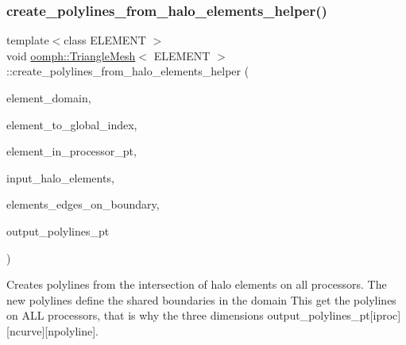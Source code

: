 \subsubsection{\texorpdfstring{create\+\_\+polylines\+\_\+from\+\_\+halo\+\_\+elements\+\_\+helper()}{create\_polylines\_from\_halo\_elements\_helper()}}
{\footnotesize\ttfamily template$<$class E\+L\+E\+M\+E\+NT $>$ \\
void \hyperlink{classoomph_1_1TriangleMesh}{oomph\+::\+Triangle\+Mesh}$<$ E\+L\+E\+M\+E\+NT $>$\+::create\+\_\+polylines\+\_\+from\+\_\+halo\+\_\+elements\+\_\+helper (\begin{DoxyParamCaption}\item[{const \hyperlink{classoomph_1_1Vector}{Vector}$<$ unsigned $>$ \&}]{element\+\_\+domain,  }\item[{std\+::map$<$ \hyperlink{classoomph_1_1GeneralisedElement}{Generalised\+Element} $\ast$, unsigned $>$ \&}]{element\+\_\+to\+\_\+global\+\_\+index,  }\item[{std\+::set$<$ \hyperlink{classoomph_1_1FiniteElement}{Finite\+Element} $\ast$$>$ \&}]{element\+\_\+in\+\_\+processor\+\_\+pt,  }\item[{\hyperlink{classoomph_1_1Vector}{Vector}$<$ \hyperlink{classoomph_1_1Vector}{Vector}$<$ \hyperlink{classoomph_1_1Vector}{Vector}$<$ \hyperlink{classoomph_1_1GeneralisedElement}{Generalised\+Element} $\ast$$>$ $>$ $>$ \&}]{input\+\_\+halo\+\_\+elements,  }\item[{std\+::map$<$ std\+::pair$<$ \hyperlink{classoomph_1_1Node}{Node} $\ast$, \hyperlink{classoomph_1_1Node}{Node} $\ast$$>$, unsigned $>$ \&}]{elements\+\_\+edges\+\_\+on\+\_\+boundary,  }\item[{\hyperlink{classoomph_1_1Vector}{Vector}$<$ \hyperlink{classoomph_1_1Vector}{Vector}$<$ \hyperlink{classoomph_1_1Vector}{Vector}$<$ \hyperlink{classoomph_1_1TriangleMeshPolyLine}{Triangle\+Mesh\+Poly\+Line} $\ast$$>$ $>$ $>$ \&}]{output\+\_\+polylines\+\_\+pt }\end{DoxyParamCaption})\hspace{0.3cm}{\ttfamily [protected]}}



Creates polylines from the intersection of halo elements on all processors. The new polylines define the shared boundaries in the domain This get the polylines on A\+LL processors, that is why the three dimensions output\+\_\+polylines\+\_\+pt\mbox{[}iproc\mbox{]}\mbox{[}ncurve\mbox{]}\mbox{[}npolyline\mbox{]}. 




